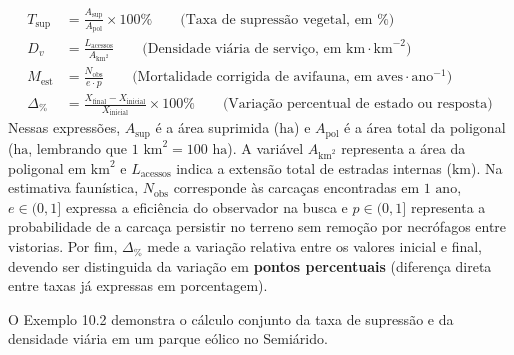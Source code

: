 \begin{boxFormula}
\begin{align}
  T_{\text{sup}} &= \frac{A_{\text{sup}}}{A_{\text{pol}}} \times 100\% \qquad \text{(Taxa de supressão vegetal, em \%)} \\[5pt]
  D_v &= \frac{L_{\text{acessos}}}{A_{\text{km}^2}} \qquad \text{(Densidade viária de serviço, em km}\cdot\text{km}^{-2}\text{)} \\[5pt]
  M_{\text{est}} &= \frac{N_{\text{obs}}}{e \cdot p} \qquad \text{(Mortalidade corrigida de avifauna, em aves}\cdot\text{ano}^{-1}\text{)} \\[5pt]
  \Delta_{\%} &= \frac{X_{\text{final}} - X_{\text{inicial}}}{X_{\text{inicial}}} \times 100\% \qquad \text{(Variação percentual de estado ou resposta)}
\end{align}
Nessas expressões, $A_{\text{sup}}$ é a área suprimida ($\text{ha}$) e $A_{\text{pol}}$ é a área total da poligonal ($\text{ha}$, lembrando que $1\text{ km}^2 = 100\text{ ha}$). A variável $A_{\text{km}^2}$ representa a área da poligonal em $\text{km}^2$ e $L_{\text{acessos}}$ indica a extensão total de estradas internas ($\text{km}$). Na estimativa faunística, $N_{\text{obs}}$ corresponde às carcaças encontradas em $1\text{ ano}$, $e \in (0, 1]$ expressa a eficiência do observador na busca e $p \in (0, 1]$ representa a probabilidade de a carcaça persistir no terreno sem remoção por necrófagos entre vistorias. Por fim, $\Delta_{\%}$ mede a variação relativa entre os valores inicial e final, devendo ser distinguida da variação em \textbf{pontos percentuais} (diferença direta entre taxas já expressas em porcentagem).
\end{boxFormula}

O Exemplo 10.2 demonstra o cálculo conjunto da taxa de supressão e da densidade viária em um parque eólico no Semiárido.

